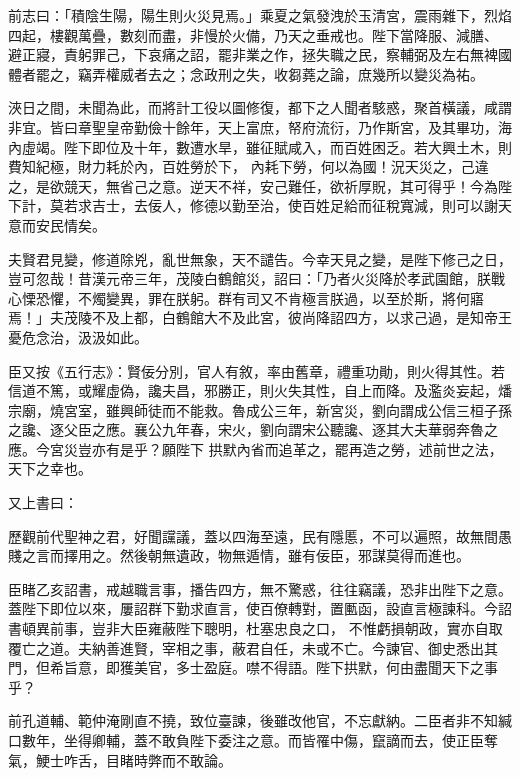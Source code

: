 \begin{pinyinscope}
 前志曰：「積陰生陽，陽生則火災見焉。」乘夏之氣發洩於玉清宮，震雨雜下，烈焰四起，樓觀萬疊，數刻而盡，非慢於火備，乃天之垂戒也。陛下當降服、減膳、
 避正寢，責躬罪己，下哀痛之詔，罷非業之作，拯失職之民，察輔弼及左右無裨國體者罷之，竊弄權威者去之；念政刑之失，收芻蕘之論，庶幾所以變災為祐。



 浹日之間，未聞為此，而將計工役以圖修復，都下之人聞者駭惑，聚首橫議，咸謂非宜。皆曰章聖皇帝勤儉十餘年，天上富庶，帑府流衍，乃作斯宮，及其畢功，海內虛竭。陛下即位及十年，數遭水旱，雖征賦咸入，而百姓困乏。若大興土木，則費知紀極，財力耗於內，百姓勞於下，
 內耗下勞，何以為國！況天災之，己違之，是欲競天，無省己之意。逆天不祥，安己難任，欲祈厚貺，其可得乎！今為陛下計，莫若求吉士，去佞人，修德以勤至治，使百姓足給而征稅寬減，則可以謝天意而安民情矣。



 夫賢君見變，修道除兇，亂世無象，天不譴告。今幸天見之變，是陛下修己之日，豈可忽哉！昔漢元帝三年，茂陵白鶴館災，詔曰：「乃者火災降於孝武園館，朕戰心慄恐懼，不燭變異，罪在朕躬。群有司又不肯極言朕過，以至於斯，將何寤
 焉！」夫茂陵不及上都，白鶴館大不及此宮，彼尚降詔四方，以求己過，是知帝王憂危念治，汲汲如此。



 臣又按《五行志》：賢佞分別，官人有敘，率由舊章，禮重功勛，則火得其性。若信道不篤，或耀虛偽，讒夫昌，邪勝正，則火失其性，自上而降。及濫炎妄起，燔宗廟，燒宮室，雖興師徒而不能救。魯成公三年，新宮災，劉向謂成公信三桓子孫之讒、逐父臣之應。襄公九年春，宋火，劉向謂宋公聽讒、逐其大夫華弱奔魯之應。今宮災豈亦有是乎？願陛下
 拱默內省而追革之，罷再造之勞，述前世之法，天下之幸也。



 又上書曰：



 歷觀前代聖神之君，好聞讜議，蓋以四海至遠，民有隱慝，不可以遍照，故無間愚賤之言而擇用之。然後朝無遺政，物無遁情，雖有佞臣，邪謀莫得而進也。



 臣睹乙亥詔書，戒越職言事，播告四方，無不驚惑，往往竊議，恐非出陛下之意。蓋陛下即位以來，屢詔群下勤求直言，使百僚轉對，置匭函，設直言極諫科。今詔書頓異前事，豈非大臣雍蔽陛下聰明，杜塞忠良之口，
 不惟虧損朝政，實亦自取覆亡之道。夫納善進賢，宰相之事，蔽君自任，未或不亡。今諫官、御史悉出其門，但希旨意，即獲美官，多士盈庭。噤不得語。陛下拱默，何由盡聞天下之事乎？



 前孔道輔、範仲淹剛直不撓，致位臺諫，後雖改他官，不忘獻納。二臣者非不知緘口數年，坐得卿輔，蓋不敢負陛下委注之意。而皆罹中傷，竄謫而去，使正臣奪氣，鯁士咋舌，目睹時弊而不敢論。




\end{pinyinscope}
